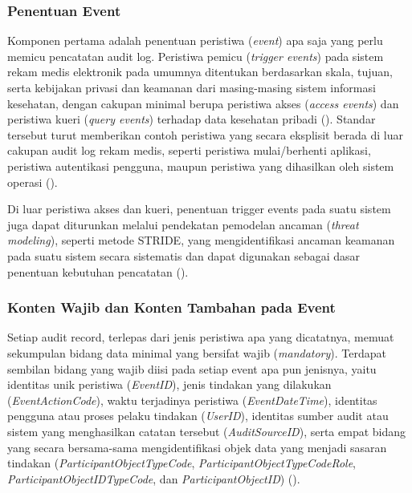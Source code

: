\subsubsection{Penentuan Event}
\label{subsubsec:penentuan-event}

Komponen pertama adalah penentuan peristiwa (\textit{event}) apa saja yang perlu memicu pencatatan audit log. Peristiwa pemicu (\textit{trigger events}) pada sistem rekam medis elektronik pada umumnya ditentukan berdasarkan skala, tujuan, serta kebijakan privasi dan keamanan dari masing-masing sistem informasi kesehatan, dengan cakupan minimal berupa peristiwa akses (\textit{access events}) dan peristiwa kueri (\textit{query events}) terhadap data kesehatan pribadi (\cite{iso27789_2021}). Standar tersebut turut memberikan contoh peristiwa yang secara eksplisit berada di luar cakupan audit log rekam medis, seperti peristiwa mulai/berhenti aplikasi, peristiwa autentikasi pengguna, maupun peristiwa yang dihasilkan oleh sistem operasi (\cite{iso27789_2021}).

Di luar peristiwa akses dan kueri, penentuan trigger events pada suatu sistem juga dapat diturunkan melalui pendekatan pemodelan ancaman (\textit{threat modeling}), seperti metode STRIDE, yang mengidentifikasi ancaman keamanan pada suatu sistem secara sistematis dan dapat digunakan sebagai dasar penentuan kebutuhan pencatatan (\cite{laksono2021stride}).

\subsubsection{Konten Wajib dan Konten Tambahan pada Event}
\label{subsubsec:konten-event}

Setiap audit record, terlepas dari jenis peristiwa apa yang dicatatnya, memuat sekumpulan bidang data minimal yang bersifat wajib (\textit{mandatory}). Terdapat sembilan bidang yang wajib diisi pada setiap event apa pun jenisnya, yaitu identitas unik peristiwa (\textit{EventID}), jenis tindakan yang dilakukan (\textit{EventActionCode}), waktu terjadinya peristiwa (\textit{EventDateTime}), identitas pengguna atau proses pelaku tindakan (\textit{UserID}), identitas sumber audit atau sistem yang menghasilkan catatan tersebut (\textit{AuditSourceID}), serta empat bidang yang secara bersama-sama mengidentifikasi objek data yang menjadi sasaran tindakan (\textit{ParticipantObjectTypeCode}, \textit{ParticipantObjectTypeCodeRole}, \textit{ParticipantObjectIDTypeCode}, dan \textit{ParticipantObjectID}) (\cite{iso27789_2021}).

